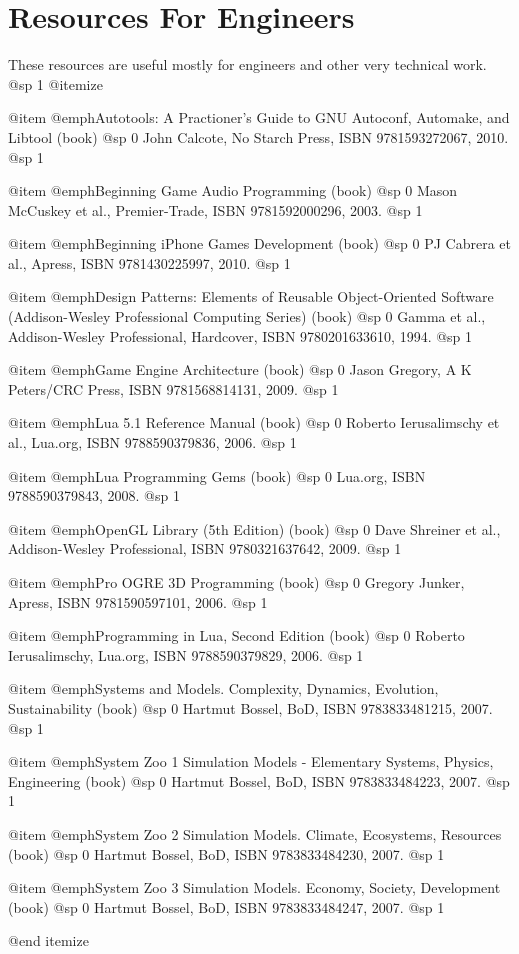 \section{Resources For Engineers}
These resources are useful mostly for engineers and other very technical work.
@sp 1
@itemize

@item
@emph{Autotools: A Practioner's Guide to GNU Autoconf, Automake, and Libtool} (book)
@sp 0
John Calcote, No Starch Press, ISBN 9781593272067, 2010.
@sp 1

@item
@emph{Beginning Game Audio Programming} (book)
@sp 0
Mason McCuskey et al., Premier-Trade, ISBN 9781592000296, 2003.
@sp 1

@item
@emph{Beginning iPhone Games Development} (book)
@sp 0
PJ Cabrera et al., Apress, ISBN 9781430225997, 2010.
@sp 1

@item
@emph{Design Patterns: Elements of Reusable Object-Oriented Software (Addison-Wesley Professional Computing Series)} (book)
@sp 0
Gamma et al., Addison-Wesley Professional, Hardcover, ISBN 9780201633610, 1994.
@sp 1

@item
@emph{Game Engine Architecture} (book)
@sp 0
Jason Gregory, A K Peters/CRC Press, ISBN 9781568814131, 2009.
@sp 1

@item
@emph{Lua 5.1 Reference Manual} (book)
@sp 0
Roberto Ierusalimschy et al., Lua.org, ISBN 9788590379836, 2006.
@sp 1

@item
@emph{Lua Programming Gems} (book)
@sp 0
Lua.org, ISBN 9788590379843, 2008.
@sp 1

@item
@emph{OpenGL Library (5th Edition)} (book)
@sp 0
Dave Shreiner et al., Addison-Wesley Professional, ISBN 9780321637642, 2009.
@sp 1

@item
@emph{Pro OGRE 3D Programming} (book)
@sp 0
Gregory Junker, Apress, ISBN 9781590597101, 2006.
@sp 1

@item
@emph{Programming in Lua, Second Edition} (book)
@sp 0
Roberto Ierusalimschy, Lua.org, ISBN 9788590379829, 2006.
@sp 1

@item
@emph{Systems and Models. Complexity, Dynamics, Evolution, Sustainability} (book)
@sp 0
Hartmut Bossel, BoD, ISBN 9783833481215, 2007.
@sp 1

@item
@emph{System Zoo 1 Simulation Models - Elementary Systems, Physics, Engineering} (book)
@sp 0
Hartmut Bossel, BoD, ISBN 9783833484223, 2007.
@sp 1

@item
@emph{System Zoo 2 Simulation Models. Climate, Ecosystems, Resources} (book)
@sp 0
Hartmut Bossel, BoD, ISBN 9783833484230, 2007.
@sp 1

@item
@emph{System Zoo 3 Simulation Models. Economy, Society, Development} (book)
@sp 0
Hartmut Bossel, BoD, ISBN 9783833484247, 2007.
@sp 1

@end itemize

